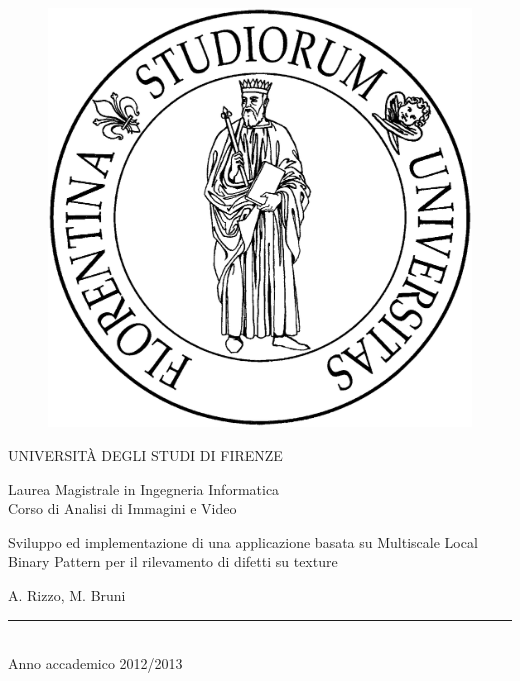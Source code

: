 \documentclass[a4paper,10pt]{article}
\begin{document}

\begin{titlepage}
\thispagestyle{empty}
\topmargin=1cm
\large

\begin{figure}[ht]
\centering
\includegraphics[scale=0.075]{img/Stemma.jpg}
\end{figure}

\begin{center}

UNIVERSITÀ DEGLI STUDI DI FIRENZE
\vspace{0.5cm}

Laurea Magistrale in Ingegneria Informatica
\\
\normalsize
Corso di Analisi di Immagini e Video
\vspace{4cm}

\begin{huge}
Sviluppo ed implementazione di una applicazione basata su Multiscale Local Binary Pattern per il rilevamento di difetti su texture
\end{huge}

\vspace{0.5cm}

A. Rizzo, M. Bruni

\vspace{4.6cm}
\rule{4cm}{.4pt}
\\
Anno accademico 2012/2013
\end{center}
\end{titlepage}
\end{document}
